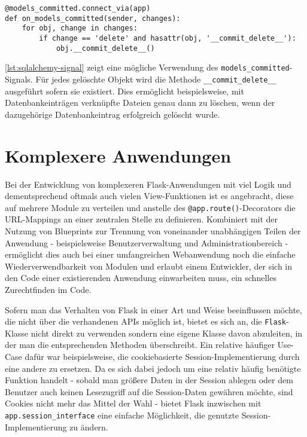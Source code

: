 \begin{lstlisting}[caption=Flask-SQLAlchemy-Signals,label=lst:sqlalchemy-signal]
@models_committed.connect_via(app)
def on_models_committed(sender, changes):
    for obj, change in changes:
        if change == 'delete' and hasattr(obj, '__commit_delete__'):
            obj.__commit_delete__()
\end{lstlisting}

\autoref{lst:sqlalchemy-signal} zeigt eine mögliche Verwendung des
\lstinline{models_committed}-Signals. Für jedes gelöschte Objekt wird die Methode
\lstinline{__commit_delete__} ausgeführt sofern sie existiert. Dies ermöglicht beispielsweise, mit
Datenbankeinträgen verknüpfte Dateien genau dann zu löschen, wenn der dazugehörige Datenbankeintrag
erfolgreich gelöscht wurde.


\section{Komplexere Anwendungen}

Bei der Entwicklung von komplexeren Flask-Anwendungen mit viel Logik und dementsprechend oftmals
auch vielen View-Funktionen ist es angebracht, diese auf mehrere Module zu verteilen und anstelle
des \lstinline{@app.route()}-Decorators die URL-Mappings an einer zentralen Stelle zu definieren.
Kombiniert mit der Nutzung von Blueprints zur Trennung von voneinander unabhängigen Teilen der
Anwendung - beispielsweise Benutzerverwaltung und Administrationbereich - ermöglicht dies auch bei
einer umfangreichen Webanwendung noch die einfache Wiederverwendbarkeit von Modulen und erlaubt
einem Entwickler, der sich in den Code einer existierenden Anwendung einwarbeiten muss, ein
schnelles Zurechtfinden im Code.

Sofern man das Verhalten von Flask in einer Art und Weise beeinflussen möchte, die nicht über die
verhandenen APIs möglich ist, bietet es sich an, die \lstinline{Flask}-Klasse nicht direkt zu
verwenden sondern eine eigene Klasse davon abzuleiten, in der man die entsprechenden Methoden
überschreibt. Ein relative häufiger Use-Case dafür war beispielsweise, die cookiebasierte
Session-Implementierung durch eine andere zu ersetzen. Da es sich dabei jedoch um eine relativ
häufig benötigte Funktion handelt - sobald man größere Daten in der Session ablegen oder dem
Benutzer auch keinen Lesezugriff auf die Session-Daten gewähren möchte, sind Cookies nicht mehr das
Mittel der Wahl - bietet Flask inzwischen mit \lstinline{app.session_interface} eine einfache
Möglichkeit, die genutzte Session-Implementierung zu ändern.
